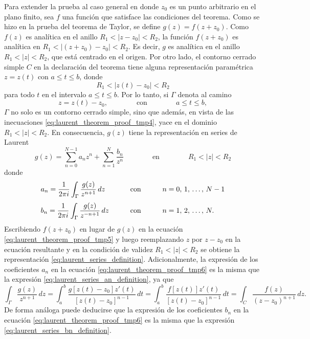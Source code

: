 \documentclass[a4paper]{report}
\begin{document}
Para extender la prueba al caso general en donde \(z_0\) es un punto arbitrario en el plano finito, sea \(f\) una función que satisface las condiciones del teorema. Como se hizo en la prueba del teorema de Taylor, se define \(g(z)=f(z+z_0)\). Como \(f(z)\) es analítica en el anillo \(R_1<|z-z_0|<R_2\), la función \(f(z+z_0)\) es analítica en \(R_1<|(z+z_0)-z_0|<R_2\). Es decir, \(g\) es analítica en el anillo \(R_1<|z|<R_2\), que está centrado en el origen. Por otro lado, el contorno cerrado simple \(C\) en la declaración del teorema tiene alguna representación paramétrica \(z=z(t)\) con \(a\leq t\leq b\), donde
\begin{equation}\label{eq:laurent_theorem_proof_tmp4}
 R_1<|z(t)-z_0|<R_2 
\end{equation}
para todo \(t\) en el intervalo \(a\leq t\leq b\). Por lo tanto, si \(\Gamma\) denota al camino
\[
 z=z(t)-z_0,
 \qquad\qquad\textrm{con}\qquad\qquad
 a\leq t\leq b,
\]
\(\Gamma\) no solo es un contorno cerrado simple, sino que además, en vista de las inecuaciones \ref{eq:laurent_theorem_proof_tmp4}, yace en el dominio \(R_1<|z|<R_2\). En consecuencia, \(g(z)\) tiene la representación en series de Laurent
\begin{equation}\label{eq:laurent_theorem_proof_tmp5}
 g(z)=\sum_{n=0}^{N-1}a_nz^n+\sum_{n=1}^N\frac{b_n}{z^n}
 \qquad\qquad\textrm{en}\qquad\qquad
 R_1<|z|<R_2 
\end{equation}
donde
\begin{equation}\label{eq:laurent_theorem_proof_tmp6}
 \begin{array}{lll}
  \displaystyle a_n=\frac{1}{2\pi i}\int_{\Gamma}\frac{g(z)}{z^{n+1}}\,dz & \qquad\textrm{con} &\qquad n=0,\,1,\,\dots,\,N-1\\[\bigskipamount]
  \displaystyle b_n=\frac{1}{2\pi i}\int_{\Gamma}\frac{g(z)}{z^{-n+1}}\,dz & \qquad\textrm{con} &\qquad n=1,\,2,\,\dots,\,N.
 \end{array} 
\end{equation}
Escribiendo \(f(z+z_0)\) en lugar de \(g(z)\) en la ecuación \ref{eq:laurent_theorem_proof_tmp5} y luego reemplazando
\(z\) por \(z-z_0\) en la ecuación resultante y en la condición de validez \(R_1<|z|<R_2 \) se obtiene la representación \ref{eq:laurent_series_definition}. Adicionalmente, la expresión de los coeficientes \(a_n\) en la ecuación \ref{eq:laurent_theorem_proof_tmp6} es la misma que la expresión \ref{eq:laurent_series_an_definition}, ya que 
\[
 \int_{\Gamma}\frac{g(z)}{z^{n+1}}\,dz=\int_a^b\frac{g[z(t)-z_0]z'(t)}{[z(t)-z_0]^{n-1}}\,dt
   =\int_a^b\frac{f[z(t)]z'(t)}{[z(t)-z_0]^{n-1}}\,dt
   =\int_{C}\frac{f(z)}{(z-z_0)^{n+1}}\,dz.
\]
De forma análoga puede deducirse que la expresión de los coeficientes \(b_n\) en la ecuación \ref{eq:laurent_theorem_proof_tmp6} es la misma que la expresión \ref{eq:laurent_series_bn_definition}.
\end{document}
